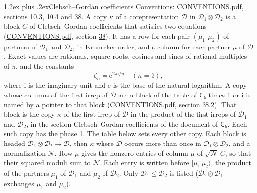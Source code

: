 \documentclass[10pt,a4paper]{article}
\makeatletter
\renewcommand\section{\@startsection{section}{1}{\z@}{-3ex plus -1ex minus -.2ex}%
  {1.2ex plus .2ex}{\normalfont\large\sffamily\bfseries\color{parttitle}}}
\numberwithin{equation}{section}
\newcommand{\grp}[1]{\mathsf{#1}}
\newcommand{\iunit}{\mathrm{i}}
\newcommand{\expe}{\mathrm{e}}
\newcommand{\rootunity}[1]{\zeta_{#1}}
\newcommand{\irrprod}{\otimes}
\newcommand{\mult}{\kappa}
\newcommand{\intx}{\mu}
\newcommand{\cgnorm}{\mathcal{N}}
\newcommand{\prodket}[2]{\lvert {#1}\,{#2}\rangle}
\makeatother
\begin{document}
\section{Clebsch--Gordan coefficients}\label{s:clebsch_gordan}
Conventions: \href{../../CONVENTIONS.pdf}{CONVENTIONS.pdf}, sections \href{../../../rotation/CONVENTIONS.pdf\#conv.10.3}{10.3}, \href{../../../rotation/CONVENTIONS.pdf\#conv.10.4}{10.4} and \href{../../CONVENTIONS.pdf\#conv.38}{38}.
\leavevmode\label{n:index.copy}\label{n:matrix.cg.stored}A copy $\mult$ of a corepresentation $\mathcal{D}$ in $\mathcal{D}_1\irrprod\mathcal{D}_2$ is a block $C$ of Clebsch--Gordan coefficients that satisfies two equations (\href{../../CONVENTIONS.pdf}{CONVENTIONS.pdf}, section \href{../../CONVENTIONS.pdf\#conv.38}{38}). \label{n:index.cg}It has a row for each pair $(\intx_1, \intx_2)$ of partners of $\mathcal{D}_1$ and $\mathcal{D}_2$, in Kronecker order, and a column for each partner $\intx$ of $\mathcal{D}$.
\leavevmode\label{n:constant.root}\label{n:index.root.order}Exact values are rationals, square roots, cosines and sines of rational multiples of $\pi$, and the constants
\begin{equation}\label{e:constants}\rootunity{n} = \expe^{2\pi\iunit/n}\quad(n = 3),\end{equation}
where $\iunit$ is the imaginary unit and $\expe$ is the base of the natural logarithm.
A copy whose columns of the first irrep of $\mathcal{D}$ are a block of the table of $\grp{C_{6}}$ times 1 or $\iunit$ is named by a pointer to that block (\href{../../CONVENTIONS.pdf}{CONVENTIONS.pdf}, section \href{../../CONVENTIONS.pdf\#conv.38.2}{38.2}). That block is the copy $\mult$ of the first irrep of $\mathcal{D}$ in the product of the first irreps of $\mathcal{D}_1$ and $\mathcal{D}_2$, in the section Clebsch--Gordan coefficients of the document of \href{../../../rotation/data/pdf/C6.pdf}{$\grp{C_{6}}$}. Each such copy has the phase 1. The table below sets every other copy.
Each block is headed $\mathcal{D}_1\irrprod\mathcal{D}_2\to\mathcal{D}$, then $\mult$ where $\mathcal{D}$ occurs more than once in $\mathcal{D}_1\irrprod\mathcal{D}_2$, and a normalization $\cgnorm$. Row $\intx$ gives the nonzero entries of column $\intx$ of $\sqrt{\cgnorm}\,C$, so that their squared moduli sum to $\cgnorm$. \label{n:vector.ket.product}Each entry is written before $\prodket{\intx_1}{\intx_2}$, the product of the partners $\intx_1$ of $\mathcal{D}_1$ and $\intx_2$ of $\mathcal{D}_2$. Only $\mathcal{D}_1 \le \mathcal{D}_2$ is listed ($\mathcal{D}_2\irrprod\mathcal{D}_1$ exchanges $\intx_1$ and $\intx_2$).
\end{document}
